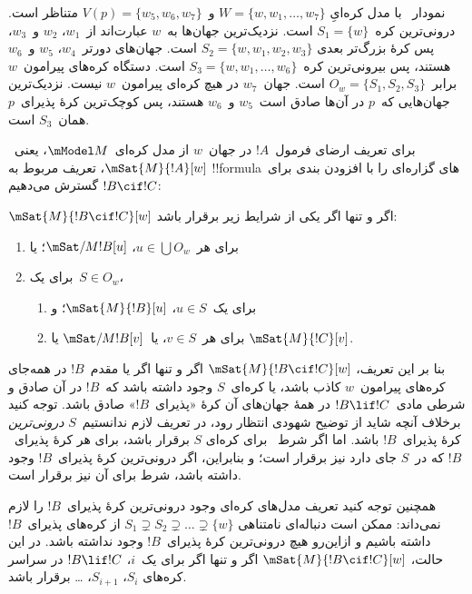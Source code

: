 \documentclass[../../../include/open-logic-section]{subfiles}
\begin{document}
نمودار~ با مدل کره‌ایِ
$W = \{w, w_1, \dots, w_7\}$ و~$V(p) = \{w_5, w_6, w_7\}$ متناظر است.
درونی‌ترین کره~$S_1 = \{w\}$ است. نزدیک‌ترین جهان‌ها به~$w$ عبارت‌اند
از~$w_1$، $w_2$ و~$w_3$، پس کرهٔ بزرگ‌تر بعدی
$S_2 = \{w, w_1, w_2, w_3\}$ است. جهان‌های دورتر~$w_4$، $w_5$ و~$w_6$
هستند، پس بیرونی‌ترین کره~$S_3 = \{w, w_1, \dots, w_6\}$ است. دستگاه
کره‌های پیرامون~$w$ برابر~$O_w = \{S_1, S_2, S_3\}$ است. جهان~$w_7$
در هیچ کره‌ای پیرامون~$w$ نیست. نزدیک‌ترین جهان‌هایی که~$p$ در آن‌ها
صادق است~$w_5$ و~$w_6$ هستند، پس کوچک‌ترین کرهٔ پذیرای~$p$ همان~$S_3$
است.

برای تعریف ارضای فرمول~$!A$ در جهان~$w$ از مدل کره‌ای~$\mModel M$،
یعنی~$\mSat{M}{!A}[w]$، تعریف مربوط به !!{formula}های گزاره‌ای را با
افزودن بندی برای~$!B \cif !C$ گسترش می‌دهیم:

\begin{defn}
  $\mSat{M}{!B \cif !C}[w]$ اگر و تنها اگر یکی از شرایط زیر برقرار باشد:
  \begin{enumerate}
  \item{} برای هر~$u \in \bigcup O_w$،
    $\mSat/{M}{!B}[u]$؛ یا
  \item{} برای یک~$S \in O_w$،
    \begin{enumerate}
      \item برای یک~$u \in S$، $\mSat{M}{!B}[u]$؛ و
      \item برای هر~$v \in S$، یا~$\mSat/{M}{!B}[v]$ یا
        $\mSat{M}{!C}[v]$.
    \end{enumerate}
  \end{enumerate}
\end{defn}

بنا بر این تعریف، $\mSat{M}{!B \cif !C}[w]$ اگر و تنها اگر یا
مقدم~$!B$ در همه‌جای کره‌های پیرامون~$w$ کاذب باشد، یا کره‌ای~$S$
وجود داشته باشد که~$!B$ در آن صادق و شرطی مادی~$!B \lif !C$ در همهٔ
جهان‌های آن کرهٔ «پذیرای~$!B$» صادق باشد. توجه کنید برخلاف آنچه شاید از
توضیح شهودی انتظار رود، در تعریف لازم ندانستیم~$S$ \emph{درونی‌ترین}
کرهٔ پذیرای~$!B$ باشد. اما اگر شرط~ برای کره‌ای
$S$ برقرار باشد، برای هر کرهٔ پذیرای~$!B$ که در~$S$ جای دارد نیز
برقرار است؛ و بنابراین، اگر درونی‌ترین کرهٔ پذیرای~$!B$ وجود داشته
باشد، شرط برای آن نیز برقرار است.

همچنین توجه کنید تعریف مدل‌های کره‌ای وجود درونی‌ترین کرهٔ پذیرای~$!B$
را لازم نمی‌داند: ممکن است دنباله‌ای نامتناهی
$S_1 \supsetneq S_2 \supsetneq \dots \supsetneq \{w\}$ از کره‌های
پذیرای~$!B$ داشته باشیم و ازاین‌رو هیچ درونی‌ترین کرهٔ پذیرای~$!B$
وجود نداشته باشد. در این حالت، $\mSat{M}{!B \cif !C}[w]$ اگر و تنها
اگر برای یک~$i$، $!B \lif !C$ در سراسر کره‌های
$S_i$، $S_{i+1}$، \dots{} برقرار باشد.
\end{document}

